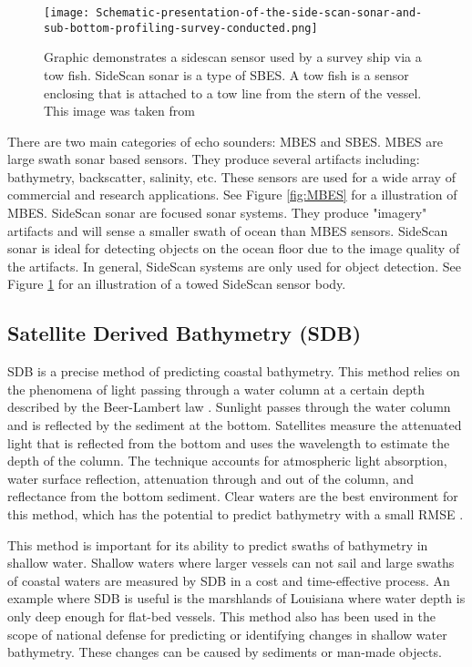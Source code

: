 \begin{figure}[htp]
    \centering
    \texttt{[image: Schematic-presentation-of-the-side-scan-sonar-and-sub-bottom-profiling-survey-conducted.png]}
    \caption{Graphic demonstrates a sidescan sensor used by a survey ship via a tow fish. SideScan sonar is a type of \ac{SBES}. 
    A tow fish is a sensor enclosing that is attached to a tow line from the stern of the vessel.
    This image was taken from \cite{sakellariou2015preliminary}}
    \label{fig:sidescandemo}
\end{figure}


There are two main categories of echo sounders: \ac{MBES} and \ac{SBES}.
\ac{MBES} are large swath sonar based sensors.
They produce several artifacts including: bathymetry, backscatter, salinity, etc.
These sensors are used for a wide array of commercial and research applications.
See Figure \ref{fig:MBES} for a illustration of \ac{MBES}.
SideScan sonar are focused sonar systems.
They produce "imagery" artifacts and will sense a smaller swath of ocean than \ac{MBES} sensors.
SideScan sonar is ideal for detecting objects on the ocean floor due to the image quality of the artifacts.
In general, SideScan systems are only used for object detection.
See Figure \ref{fig:sidescandemo} for an illustration of a towed SideScan sensor body.




\subsection{Satellite Derived Bathymetry (SDB)}
\ac{SDB} is a precise method of predicting coastal bathymetry. 
This method relies on the phenomena of light passing through a water column at a certain depth described by the Beer-Lambert law \cite{chybicki2018three}\cite{vinayaraj2016satellite}.
Sunlight passes through the water column and is reflected by the sediment at the bottom.
Satellites measure the attenuated light that is reflected from the bottom and uses the wavelength to estimate the depth of the column.
The technique accounts for atmospheric light absorption, water surface reflection, attenuation through and out of the column, and reflectance from the bottom sediment.
Clear waters are the best environment for this method, which has the potential to predict bathymetry with a small RMSE \cite{chybicki2018three}.

\par
This method is important for its ability to predict swaths of bathymetry in shallow water.
Shallow waters where larger vessels can not sail and large swaths of coastal waters are measured by \ac{SDB} in a cost and time-effective process.
An example where \ac{SDB} is useful is the marshlands of Louisiana where water depth is only deep enough for flat-bed vessels.
This method also has been used in the scope of national defense for predicting or identifying changes in shallow water bathymetry.
These changes can be caused by sediments or man-made objects. 

